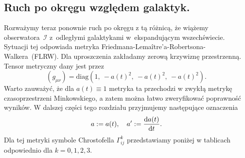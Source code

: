 \subsection{Ruch po okręgu względem galaktyk.}
Rozważymy teraz ponownie ruch po okręgu z tą różnicą, że 
wiążemy obserwatora~$\mathcal{I}$ z~odległymi galaktykami w~ekspandującym 
wszechświecie. Sytuacji tej odpowiada metryka 
Friedmana-Lemaître’a-Robertsona-Walkera~(FLRW).
Dla uproszczenia zakładamy zerową krzywiznę przestrzenną.
Tensor metryczny dany jest przez
\begin{equation}\label{FLRWmetric}
(g_{\mu\nu}) = \text{diag} (1,\ -a(t)^2,\ -a(t)^2,\ -a(t)^2).
\end{equation}
Warto zauważyć, że dla $a(t) \equiv 1$ metryka ta przechodzi
w zwykłą metrykę czasoprzestrzeni Minkowskiego, a zatem 
można łatwo zweryfikować poprawność wyników.
W dalszej części tego rozdziału przyjmujemy następujące oznaczenia 
\begin{align}\nonumber
a:=a(t),\quad a':=\frac{\text{d} a(t)}{ \text{d} t}.
\end{align}
Dla tej metryki symbole Chrostofella $\Gamma^k _{ij}$ przedstawiamy
 poniżej w tablicach odpowiednio dla $k=0,1,2,3$.
